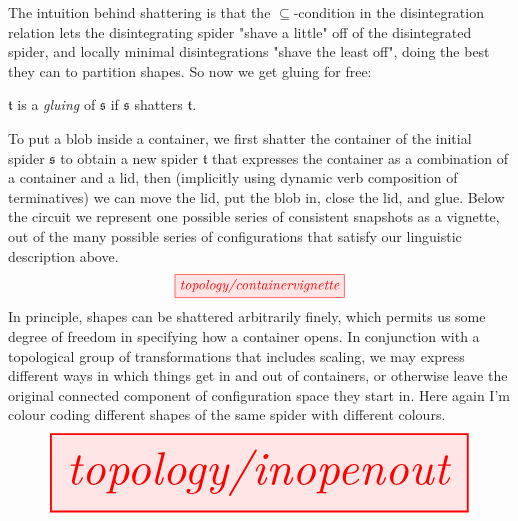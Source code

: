 The intuition behind shattering is that the $\subseteq$-condition in the disintegration relation lets the disintegrating spider "shave a little" off of the disintegrated spider, and locally minimal disintegrations "shave the least off", doing the best they can to partition shapes. So now we get gluing for free:

\begin{defn}
$\mathfrak{t}$ is a \emph{gluing} of $\mathfrak{s}$ if $\mathfrak{s}$ shatters $\mathfrak{t}$.
\end{defn}

\begin{example}
To put a blob inside a container, we first shatter the container of the initial spider $\mathfrak{s}$ to obtain a new spider $\mathfrak{t}$ that expresses the container as a combination of a container and a lid, then (implicitly using dynamic verb composition of terminatives) we can move the lid, put the blob in, close the lid, and glue. Below the circuit we represent one possible series of consistent snapshots as a vignette, out of the many possible series of configurations that satisfy our linguistic description above.
\[\tikzfig{topology/containervignette}\]
In principle, shapes can be shattered arbitrarily finely, which permits us some degree of freedom in specifying how a container opens. In conjunction with a topological group of transformations that includes scaling, we may express different ways in which things get in and out of containers, or otherwise leave the original connected component of configuration space they start in. Here again I'm colour coding different shapes of the same spider with different colours.
\[\resizebox{\textwidth}{!}{\tikzfig{topology/inopenout}}\]
\end{example}

